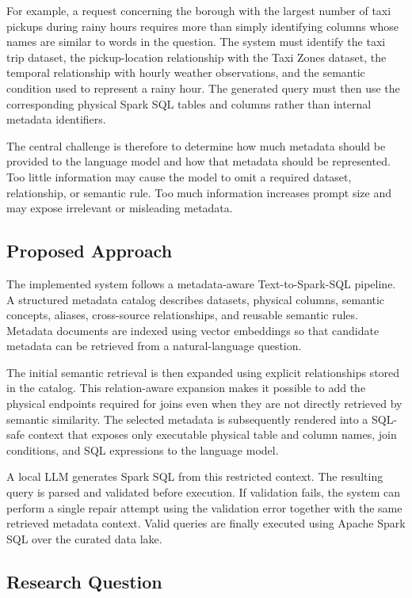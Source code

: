 For example, a request concerning the borough with the largest number of taxi
pickups during rainy hours requires more than simply identifying columns whose
names are similar to words in the question. The system must identify the taxi
trip dataset, the pickup-location relationship with the Taxi Zones dataset,
the temporal relationship with hourly weather observations, and the semantic
condition used to represent a rainy hour. The generated query must then use
the corresponding physical Spark SQL tables and columns rather than internal
metadata identifiers.

The central challenge is therefore to determine how much metadata should be
provided to the language model and how that metadata should be represented.
Too little information may cause the model to omit a required dataset,
relationship, or semantic rule. Too much information increases prompt size and
may expose irrelevant or misleading metadata.


\subsection{Proposed Approach}

The implemented system follows a metadata-aware Text-to-Spark-SQL pipeline.
A structured metadata catalog describes datasets, physical columns, semantic
concepts, aliases, cross-source relationships, and reusable semantic rules.
Metadata documents are indexed using vector embeddings so that candidate
metadata can be retrieved from a natural-language question.

The initial semantic retrieval is then expanded using explicit relationships
stored in the catalog. This relation-aware expansion makes it possible to add
the physical endpoints required for joins even when they are not directly
retrieved by semantic similarity. The selected metadata is subsequently
rendered into a SQL-safe context that exposes only executable physical table
and column names, join conditions, and SQL expressions to the language model.

A local LLM generates Spark SQL from this restricted context. The resulting
query is parsed and validated before execution. If validation fails, the
system can perform a single repair attempt using the validation error together
with the same retrieved metadata context. Valid queries are finally executed
using Apache Spark SQL over the curated data lake.


\subsection{Research Question}

